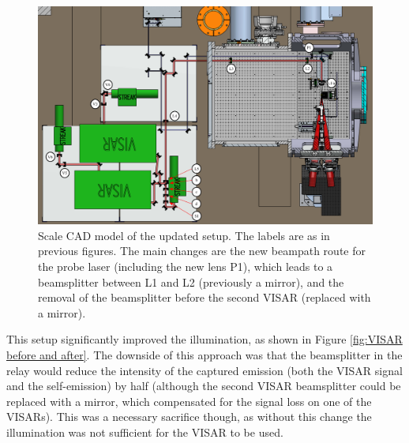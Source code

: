 \begin{figure}
	\begin{centering}
		\includegraphics[width=1.0\textwidth]{figures/Experiment/FinalCad.pdf}%
		\caption{\label{fig:Full setup} Scale CAD model of the updated setup. The labels are as in previous figures. The main changes are the new beampath route for the probe laser (including the new lens P1), which leads to a beamsplitter between L1 and L2 (previously a mirror), and the removal of the beamsplitter before the second VISAR (replaced with a mirror).}
	\end{centering}
\end{figure}

This setup significantly improved the illumination, as shown in Figure \ref{fig:VISAR before and after}. The downside of this approach was that the beamsplitter in the relay would reduce the intensity of the captured emission (both the VISAR signal and the self-emission) by half (although the second VISAR beamsplitter could be replaced with a mirror, which compensated for the signal loss on one of the VISARs). This was a necessary sacrifice though, as without this change the illumination was not sufficient for the VISAR to be used.

